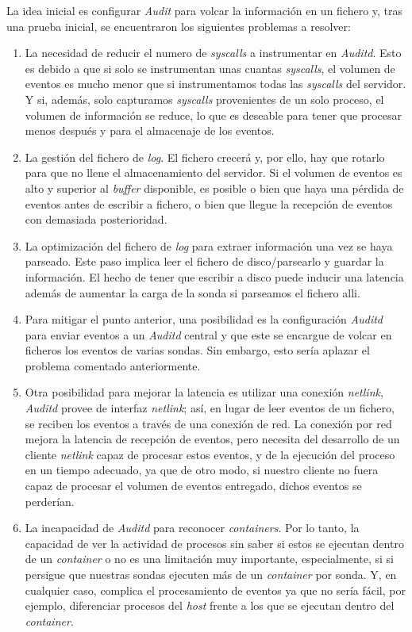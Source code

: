 La idea inicial es configurar \emph{Audit} para volcar la información en un fichero y, tras una prueba inicial, se encuentraron los siguientes problemas a resolver:

\begin{enumerate}
    \item La necesidad de reducir el numero de \emph{syscalls} a instrumentar en \emph{Auditd}. Esto es debido a que si solo se instrumentan unas cuantas \emph{syscalls}, el volumen de eventos es mucho menor que si
    instrumentamos todas las \emph{syscalls} del servidor. Y si, además, solo capturamos \emph{syscalls} provenientes de un solo proceso, el volumen de información se reduce, lo que es 
    deseable para tener que procesar menos después y para el almacenaje de los eventos.
    \item La gestión del fichero de \emph{log}. El fichero crecerá y, por ello, hay que rotarlo para que no llene el almacenamiento del servidor. Si el volumen de eventos es alto y superior 
    al \emph{buffer} disponible, es posible o bien que haya una pérdida de eventos antes de escribir a fichero, o bien que llegue la recepción de eventos con demasiada posterioridad.
    \item La optimización del fichero de \emph{log} para extraer información una vez se haya parseado. Este paso implica leer el fichero de disco/parsearlo y guardar la información. El hecho de tener que escribir a disco puede inducir una latencia además de aumentar la carga de la sonda si parseamos el fichero alli.
    \item Para mitigar el punto anterior, una posibilidad es la configuración  \emph{Auditd} para enviar eventos a un \emph{Auditd} central y que este se encargue de volcar en ficheros los eventos de varias sondas. Sin embargo, esto sería aplazar el problema
    comentado anteriormente.
    \item Otra posibilidad para mejorar la latencia es utilizar una conexión \emph{netlink},
    \emph{Auditd} provee de interfaz \emph{netlink}; así, en lugar de leer eventos de un fichero, 
    se reciben los eventos a través de una conexión de red. 
    La conexión por red mejora la latencia de recepción de eventos, 
    pero necesita del desarrollo de un cliente \emph{netlink} capaz de procesar estos eventos, 
    y de la ejecución del proceso en un tiempo adecuado, ya que de otro modo, 
    si nuestro cliente no fuera capaz de procesar el volumen de eventos entregado,
    dichos eventos se perderían.
    \item La incapacidad de \emph{Auditd} para reconocer \emph{containers}. Por lo tanto, la capacidad de ver la actividad de procesos
    sin saber si estos se ejecutan dentro de un \emph{container} o no es una limitación muy importante, especialmente, si si persigue que nuestras sondas
    ejecuten más de un \emph{container} por sonda. Y, en cualquier caso, complica el procesamiento de eventos ya que no sería fácil, por ejemplo, diferenciar procesos
    del \emph{host} frente a los que se ejecutan dentro del \emph{container}.
\end{enumerate}

